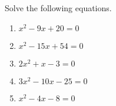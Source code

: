 \documentclass{article}
\begin{document}
\HomeworkTitle[class={College Algebra}, number={2}, name={Quadratic Equations}]

Solve the following equations.

\begin{enumerate}
\item $x^2 - 9x + 20 = 0$

   \vspace{4cm}

\item $x^2 - 15x + 54 = 0$

   \vspace{4cm}

\item $2x^2 + x - 3 = 0$

   \vspace{4cm}

\item $3x^2 - 10x - 25 = 0$

   \vspace{4cm}

\item 

$x^2 - 4x - 8 = 0$

  
\end{enumerate}
\end{document}
